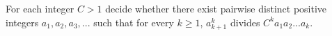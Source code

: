 For each integer $C>1$ decide whether there exist pairwise distinct positive integers $a_1,a_2,a_3,...$ such that for every $k\ge 1$, $a_{k+1}^k$ divides $C^ka_1a_2...a_k$.

